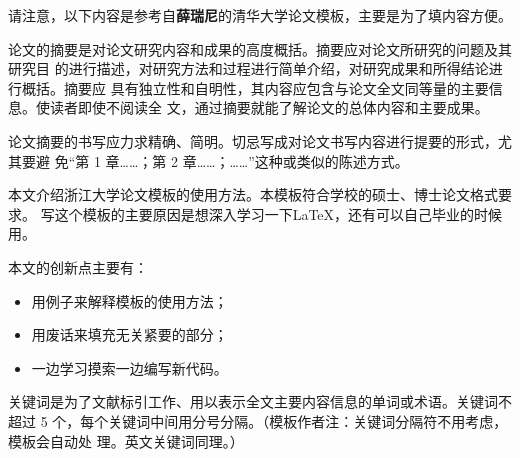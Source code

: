 
\begin{cabstract}
请注意，以下内容是参考自\textbf{薛瑞尼}的清华大学论文模板，主要是为了填内容方便。

论文的摘要是对论文研究内容和成果的高度概括。摘要应对论文所研究的问题及其研究目
的进行描述，对研究方法和过程进行简单介绍，对研究成果和所得结论进行概括。摘要应
具有独立性和自明性，其内容应包含与论文全文同等量的主要信息。使读者即使不阅读全
文，通过摘要就能了解论文的总体内容和主要成果。

论文摘要的书写应力求精确、简明。切忌写成对论文书写内容进行提要的形式，尤其要避
免“第 1 章……；第 2 章……；……”这种或类似的陈述方式。

本文介绍浙江大学论文模板的使用方法。本模板符合学校的硕士、博士论文格式要求。
写这个模板的主要原因是想深入学习一下\LaTeX，还有可以自己毕业的时候用。

本文的创新点主要有：
\begin{itemize}
    \item 用例子来解释模板的使用方法；
    \item 用废话来填充无关紧要的部分；
    \item 一边学习摸索一边编写新代码。
\end{itemize}

关键词是为了文献标引工作、用以表示全文主要内容信息的单词或术语。关键词不超过 5
个，每个关键词中间用分号分隔。（模板作者注：关键词分隔符不用考虑，模板会自动处
理。英文关键词同理。）
\end{cabstract}

